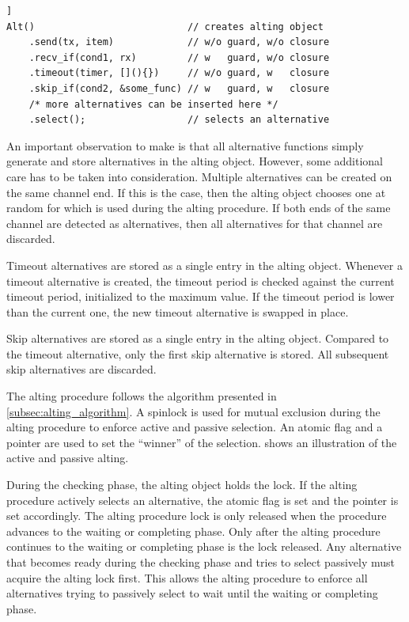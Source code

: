 \begin{lstfloat}
\begin{lstlisting}[caption={Code example of alting.}, label={lst:code_example_alting}, style={CustomC++}, xleftmargin={2em}]]
Alt()                           // creates alting object
    .send(tx, item)             // w/o guard, w/o closure
    .recv_if(cond1, rx)         // w   guard, w/o closure
    .timeout(timer, [](){})     // w/o guard, w   closure
    .skip_if(cond2, &some_func) // w   guard, w   closure
    /* more alternatives can be inserted here */
    .select();                  // selects an alternative
\end{lstlisting}
\end{lstfloat}

An important observation to make is that all alternative functions simply generate and store alternatives in the alting object. However, some additional care has to be taken into consideration. Multiple alternatives can be created on the same channel end. If this is the case, then the alting object chooses one at random for which is used during the alting procedure. If both ends of the same channel are detected as alternatives, then all alternatives for that channel are discarded.

Timeout alternatives are stored as a single entry in the alting object. Whenever a timeout alternative is created, the timeout period is checked against the current timeout period, initialized to the maximum value. If the timeout period is lower than the current one, the new timeout alternative is swapped in place.

Skip alternatives are stored as a single entry in the alting object. Compared to the timeout alternative, only the first skip alternative is stored. All subsequent skip alternatives are discarded.

The alting procedure follows the algorithm presented in \cref{subsec:alting_algorithm}. A spinlock is used for mutual exclusion during the alting procedure to enforce active and passive selection. An atomic flag and a pointer are used to set the ``winner'' of the selection.  shows an illustration of the active and passive alting.

During the checking phase, the alting object holds the lock. If the alting procedure actively selects an alternative, the atomic flag is set and the pointer is set accordingly. The alting procedure lock is only released when the procedure advances to the waiting or completing phase. Only after the alting procedure continues to the waiting or completing phase is the lock released. Any alternative that becomes ready during the checking phase and tries to select passively must acquire the alting lock first. This allows the alting procedure to enforce all alternatives trying to passively select to wait until the waiting or completing phase. 

